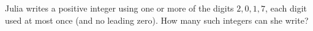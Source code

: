 Julia writes a positive integer using one or more of the digits $2,0,1,7$, each digit used at most once (and no leading zero). How many such integers can she write?
